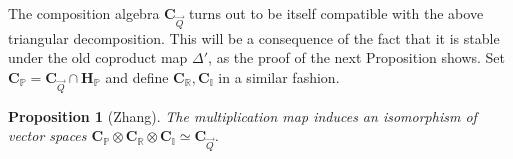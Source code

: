\documentclass[a4paper,10pt]{amsart}
\def\H{\mathbf{H}}
\newtheorem{prop}[theo]{Proposition}
\numberwithin{equation}{section}
\begin{document}
\vspace{.15in}

The composition algebra $\mathbf{C}_{\vec{Q}}$ turns out to be itself compatible with the above triangular decomposition. This will be a consequence of the fact that it is stable under the old coproduct map $\Delta'$, as the proof of the next Proposition shows. Set $\mathbf{C}_{\mathbb{P}}=\mathbf{C}_{\vec{Q}} \cap \H_{\mathbb{P}}$ and define $\mathbf{C}_{\mathbb{R}}, \mathbf{C}_{\mathbb{I}}$ in a similar fashion.


\vspace{.1in}

\begin{prop}[Zhang]\label{P:halldecompopo} The multiplication map induces an isomorphism of vector spaces $\mathbf{C}_{\mathbb{P}} \otimes \mathbf{C}_{\mathbb{R}} \otimes \mathbf{C}_{\mathbb{I}} \simeq \mathbf{C}_{\vec{Q}}$.
\end{prop}
\end{document}
